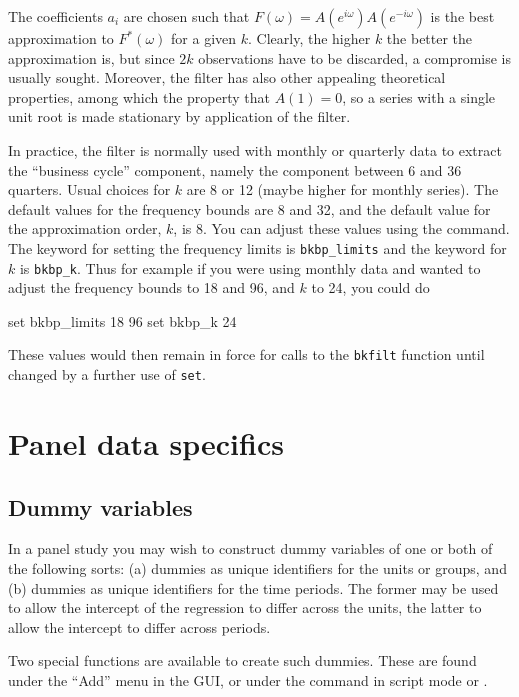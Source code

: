 The coefficients $a_i$ are chosen such that $F(\omega)
= A(e^{i\omega})A(e^{-i\omega})$ is the best approximation to
$F^*(\omega)$ for a given $k$. Clearly, the higher $k$ the better the
approximation is, but since $2k$ observations have to be discarded, a
compromise is usually sought. Moreover, the filter has also other
appealing theoretical properties, among which the property that $A(1)
= 0$, so a series with a single unit root is made stationary by
application of the filter.

In practice, the filter is normally used with monthly or quarterly
data to extract the ``business cycle'' component, namely the component
between 6 and 36 quarters. Usual choices for $k$ are 8 or 12 (maybe
higher for monthly series).  The default values for the frequency
bounds are 8 and 32, and the default value for the approximation
order, $k$, is 8. You can adjust these values using the 
command. The keyword for setting the frequency limits is
\verb+bkbp_limits+ and the keyword for $k$ is \verb+bkbp_k+.  Thus for
example if you were using monthly data and wanted to adjust the
frequency bounds to 18 and 96, and $k$ to 24, you could do

\begin{code}
    set bkbp_limits 18 96
    set bkbp_k 24
\end{code}

These values would then remain in force for calls to the \verb+bkfilt+
function until changed by a further use of \verb+set+.
      
\section{Panel data specifics}
\label{panel-genr}

\subsection{Dummy variables}
\label{dummies}

In a panel study you may wish to construct dummy variables of one or
both of the following sorts: (a) dummies as unique identifiers for the
units or groups, and (b) dummies as unique identifiers for the time
periods.  The former may be used to allow the intercept of the
regression to differ across the units, the latter to allow the
intercept to differ across periods.

Two special functions are available to create such dummies.  These are
found under the ``Add'' menu in the GUI, or under the 
command in script mode or .


